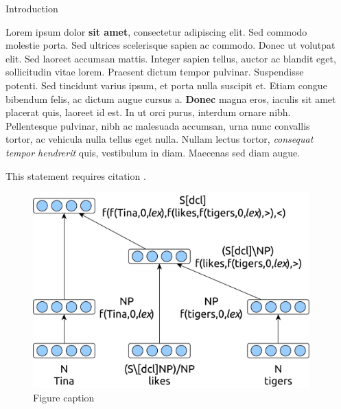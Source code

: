 \documentclass[final]{beamer}
\newlength{\sepwid}
\newlength{\onecolwid}
\begin{document}
\begin{frame}[t]
\begin{columns}[t]
\begin{column}{\onecolwid}
      \begin{block}{Introduction}

        Lorem ipsum dolor \textbf{sit amet}, consectetur adipiscing elit. Sed commodo molestie porta. Sed ultrices scelerisque sapien ac commodo. Donec ut volutpat elit. Sed laoreet accumsan mattis. Integer sapien tellus, auctor ac blandit eget, sollicitudin vitae lorem. Praesent dictum tempor pulvinar. Suspendisse potenti. Sed tincidunt varius ipsum, et porta nulla suscipit et. Etiam congue bibendum felis, ac dictum augue cursus a. \textbf{Donec} magna eros, iaculis sit amet placerat quis, laoreet id est. In ut orci purus, interdum ornare nibh. Pellentesque pulvinar, nibh ac malesuada accumsan, urna nunc convallis tortor, ac vehicula nulla tellus eget nulla. Nullam lectus tortor, \textit{consequat tempor hendrerit} quis, vestibulum in diam. Maecenas sed diam augue.

        This statement requires citation \cite{Hermann:2013:ACL}.

      \end{block}


      \begin{figure}
        \includegraphics[width=0.8\linewidth]{fig1.pdf}
        \caption{Figure caption}
      \end{figure}


    \end{column} %

  \begin{column}{\sepwid}\end{column} %


\end{columns}
\end{frame}
\end{document}
